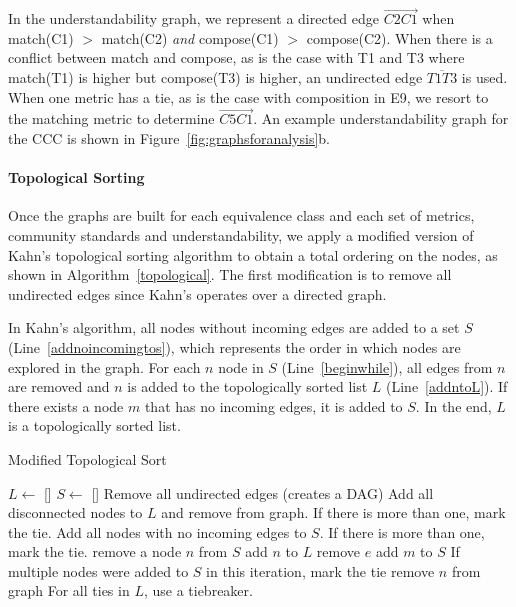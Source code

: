 In the understandability graph, we represent a directed edge  $\overrightarrow{C2C1}$ when match(C1) $>$ match(C2) \emph{and} compose(C1) $>$ compose(C2). When there is a conflict between match and compose, as is the case with T1 and T3 where match(T1) is higher but compose(T3) is higher, an undirected edge $\overline{T1T3}$ is used. When one metric has a tie, as is the case with composition in E9, we resort to the matching metric to determine  $\overrightarrow{C5C1}$. An example understandability graph for the CCC is shown in Figure~\ref{fig:graphsforanalysis}b.

\paragraph{Topological Sorting}
Once the graphs are built for each equivalence class and each set of metrics, community standards and understandability, we apply a modified version of Kahn's topological sorting algorithm to obtain a total ordering on the nodes, as shown in Algorithm~\ref{topological}. The first modification is to remove all undirected edges since Kahn's operates over a directed graph.

In Kahn's algorithm, all nodes without incoming edges are added to a set $S$ (Line~\ref{addnoincomingtos}), which represents the order in which nodes are explored in the graph. For each $n$ node in $S$ (Line~\ref{beginwhile}), all edges from $n$ are removed and $n$ is added to the topologically sorted list $L$ (Line~\ref{addntoL}). If there exists a node $m$ that has no incoming edges, it is added to $S$.  In the end, $L$ is a topologically sorted list.

\begin{algorithm}
  \caption{Modified Topological Sort}\label{topological}
  \begin{algorithmic}[1]
\State  $L \gets$ []
\State $S \gets$ []
\State Remove all undirected edges (creates a DAG)
\State Add all disconnected nodes to $L$ and remove from graph. If there is more than one, mark the tie. \label{markTie1}
\State Add all nodes with no incoming edges to $S$. If there is more than one, mark the tie. \label{addnoincomingtos}
 \label{beginwhile}
    \State remove a node $n$ from $S$ \label{setn}
    \State add $n$ to $L$  \label{addntoL}
        \State remove $e$
            \State add $m$ to $S$ \label{addToS}
        \EndIf
    \EndFor
    \State If multiple nodes were added to $S$ in this iteration, mark the tie \label{markTie2}
    \State remove $n$ from graph
\EndWhile
\State For all ties in $L$, use a tiebreaker.
  \end{algorithmic}
\end{algorithm}

